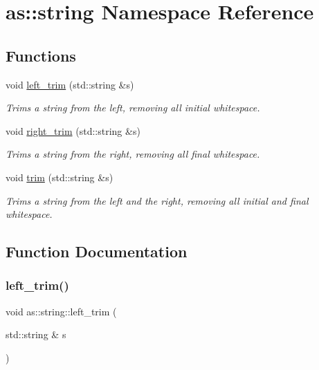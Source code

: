\hypertarget{namespaceas_1_1string}{}\section{as\+:\+:string Namespace Reference}
\label{namespaceas_1_1string}
\subsection*{Functions}
\begin{DoxyCompactItemize}
\item 
void \hyperlink{namespaceas_1_1string_a608048dc1f3a08c88ad0f5ff87b58c1d}{left\+\_\+trim} (std\+::string \&s)
\begin{DoxyCompactList}\small\item\em Trims a string from the left, removing all initial whitespace. \end{DoxyCompactList}\item 
void \hyperlink{namespaceas_1_1string_a748afb440479e4824710ab07d92cbe68}{right\+\_\+trim} (std\+::string \&s)
\begin{DoxyCompactList}\small\item\em Trims a string from the right, removing all final whitespace. \end{DoxyCompactList}\item 
void \hyperlink{namespaceas_1_1string_aa654dd12f0ebc738431eee149e2a8242}{trim} (std\+::string \&s)
\begin{DoxyCompactList}\small\item\em Trims a string from the left and the right, removing all initial and final whitespace. \end{DoxyCompactList}\end{DoxyCompactItemize}


\subsection{Function Documentation}
\mbox{\label{namespaceas_1_1string_a608048dc1f3a08c88ad0f5ff87b58c1d}} 
\subsubsection{\texorpdfstring{left\+\_\+trim()}{left\_trim()}}
{\footnotesize\ttfamily void as\+::string\+::left\+\_\+trim (\begin{DoxyParamCaption}\item[{std\+::string \&}]{s }\end{DoxyParamCaption})\hspace{0.3cm}{\ttfamily [inline]}}



